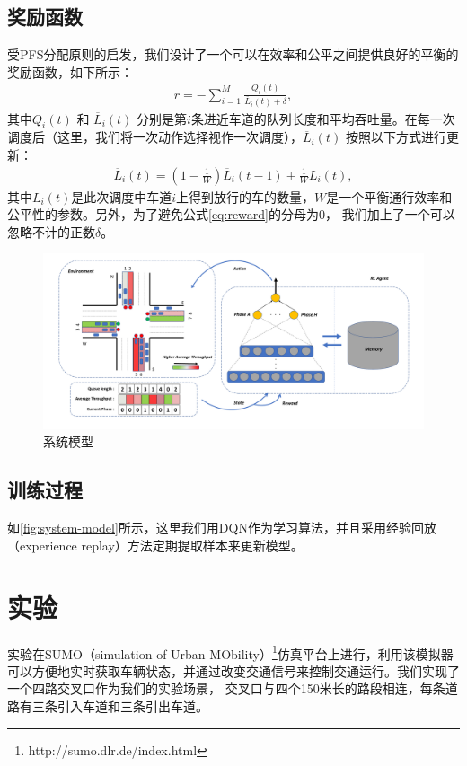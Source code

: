 \subsection*{奖励函数}
受PFS分配原则的启发，我们设计了一个可以在效率和公平之间提供良好的平衡的奖励函数，如下所示：
\begin{align}
\label{eq:reward}
    r = -\sum_{i=1}^{M} \frac{Q_i(t)}{\overline{L}_i(t) + \delta},
\end{align}
其中$Q_i(t)$ 和 $\overline{L}_i(t)$ 分别是第$i$条进近车道的队列长度和平均吞吐量。在每一次调度后（这里，我们将一次动作选择视作一次调度），$\overline{L}_i(t)$ 按照以下方式进行更新：
\begin{align}
    \overline{L}_i(t) = (1-\frac{1}{W})\overline{L}_i(t-1) + \frac{1}{W}L_i(t),
\end{align}
其中$L_i(t)$是此次调度中车道$i$上得到放行的车的数量，$W$是一个平衡通行效率和公平性的参数。另外，为了避免公式\ref{eq:reward}的分母为0， 我们加上了一个可以忽略不计的正数$\delta$。

\begin{figure}[htb]
  \includegraphics[width=.9\textwidth]{fig/sysmodel.pdf}
  \caption{系统模型}
  \label{fig:system-model}
\end{figure}

\subsection*{训练过程}
如\autoref{fig:system-model}所示，这里我们用DQN作为学习算法，并且采用经验回放\cite{mnih2015human}（experience replay）方法定期提取样本来更新模型。

\section{实验}
实验在SUMO（simulation of Urban MObility）\footnote{http://sumo.dlr.de/index.html}仿真平台上进行，利用该模拟器可以方便地实时获取车辆状态，并通过改变交通信号来控制交通运行。我们实现了一个四路交叉口作为我们的实验场景，
交叉口与四个150米长的路段相连，每条道路有三条引入车道和三条引出车道。


